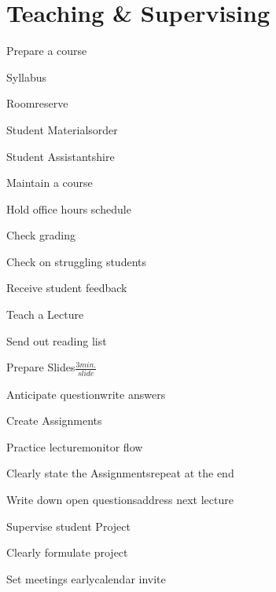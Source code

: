 \section{Teaching \& Supervising}

\begin{checklist}{Prepare a course}
\item{Syllabus}{}
\item{Room}{reserve}
\item{Student Materials}{order}
\item{Student Assistants}{hire}
\end{checklist}

\begin{checklist}{Maintain a course}
\item{Hold office hours}{ schedule}
\item{Check grading}{}
\item{Check on struggling students}{}
\item{Receive student feedback}{}
\end{checklist}


\begin{checklist}{Teach a Lecture}
\item{Send out reading list}{}
\item{Prepare Slides}{$\frac{3min.}{slide}$}
\item{Anticipate question}{write answers}
\item{Create Assignments}{}
\item{Practice lecture}{monitor flow}
\item{Clearly state the Assignments}{repeat at the end}
\item{Write down open questions}{address next lecture}
\end{checklist}

\begin{checklist}{Supervise student Project}
\item{Clearly formulate project}{}
\item{Set meetings early}{calendar invite}
\end{checklist}
